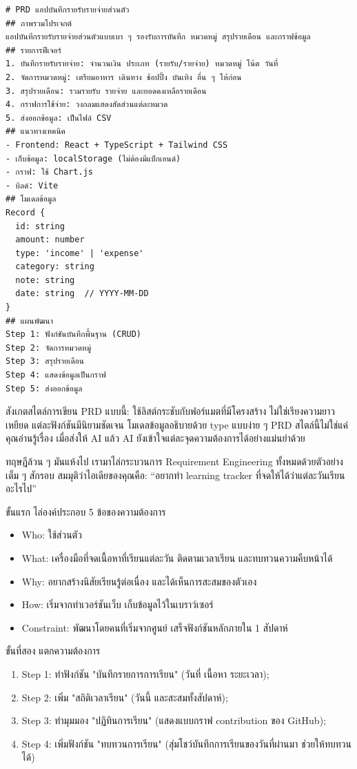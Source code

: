 \begin{lstlisting}
# PRD แอปบันทึกรายรับรายจ่ายส่วนตัว
## ภาพรวมโปรเจกต์
แอปบันทึกรายรับรายจ่ายส่วนตัวแบบเบา ๆ รองรับการบันทึก หมวดหมู่ สรุปรายเดือน และกราฟข้อมูล
## รายการฟีเจอร์
1. บันทึกรายรับรายจ่าย: จำนวนเงิน ประเภท (รายรับ/รายจ่าย) หมวดหมู่ โน้ต วันที่
2. จัดการหมวดหมู่: เตรียมอาหาร เดินทาง ช้อปปิ้ง บันเทิง อื่น ๆ ให้ก่อน
3. สรุปรายเดือน: รวมรายรับ รายจ่าย และยอดคงเหลือรายเดือน
4. กราฟการใช้จ่าย: วงกลมแสดงสัดส่วนแต่ละหมวด
5. ส่งออกข้อมูล: เป็นไฟล์ CSV
## แนวทางเทคนิค
- Frontend: React + TypeScript + Tailwind CSS
- เก็บข้อมูล: localStorage (ไม่ต้องมีแบ็กเอนด์)
- กราฟ: ใช้ Chart.js
- บิลด์: Vite
## โมเดลข้อมูล
Record {
  id: string
  amount: number
  type: 'income' | 'expense'
  category: string
  note: string
  date: string  // YYYY-MM-DD
}
## แผนพัฒนา
Step 1: ฟังก์ชันบันทึกพื้นฐาน (CRUD)
Step 2: จัดการหมวดหมู่
Step 3: สรุปรายเดือน
Step 4: แสดงข้อมูลเป็นกราฟ
Step 5: ส่งออกข้อมูล
\end{lstlisting}

สังเกตสไตล์การเขียน PRD แบบนี้: ใช้ลิสต์กระชับกับฟอร์แมตที่มีโครงสร้าง ไม่ใช่เรียงความยาวเหยียด แต่ละฟังก์ชันมีนิยามชัดเจน โมเดลข้อมูลอธิบายด้วย type แบบง่าย ๆ PRD สไตล์นี้ไม่ใช่แค่คุณอ่านรู้เรื่อง เมื่อส่งให้ AI แล้ว AI ยังเข้าใจแต่ละจุดความต้องการได้อย่างแม่นยำด้วย


ทฤษฎีล้วน ๆ มันแห้งไป เรามาไล่กระบวนการ Requirement Engineering ทั้งหมดด้วยตัวอย่างเต็ม ๆ สักรอบ สมมุติว่าไอเดียของคุณคือ: “อยากทำ learning tracker ที่จดให้ได้ว่าแต่ละวันเรียนอะไรไป”

ขั้นแรก ไล่องค์ประกอบ 5 ข้อของความต้องการ

\begin{itemize}
  \item Who: ใช้ส่วนตัว
  \item What: เครื่องมือที่จดเนื้อหาที่เรียนแต่ละวัน ติดตามเวลาเรียน และทบทวนความคืบหน้าได้
  \item Why: อยากสร้างนิสัยเรียนรู้ต่อเนื่อง และได้เห็นการสะสมของตัวเอง
  \item How: เริ่มจากทำเวอร์ชันเว็บ เก็บข้อมูลไว้ในเบราว์เซอร์
  \item Constraint: พัฒนาโดยคนที่เริ่มจากศูนย์ เสร็จฟังก์ชันหลักภายใน 1 สัปดาห์
\end{itemize}

ขั้นที่สอง แตกความต้องการ

\begin{enumerate}
  \item Step 1: ทำฟังก์ชัน "บันทึกรายการการเรียน" (วันที่ เนื้อหา ระยะเวลา);
  \item Step 2: เพิ่ม "สถิติเวลาเรียน" (วันนี้ และสะสมทั้งสัปดาห์);
  \item Step 3: ทำมุมมอง "ปฏิทินการเรียน" (แสดงแบบกราฟ contribution ของ GitHub);
  \item Step 4: เพิ่มฟังก์ชัน "ทบทวนการเรียน" (สุ่มโชว์บันทึกการเรียนของวันที่ผ่านมา ช่วยให้ทบทวนได้)
\end{enumerate}

